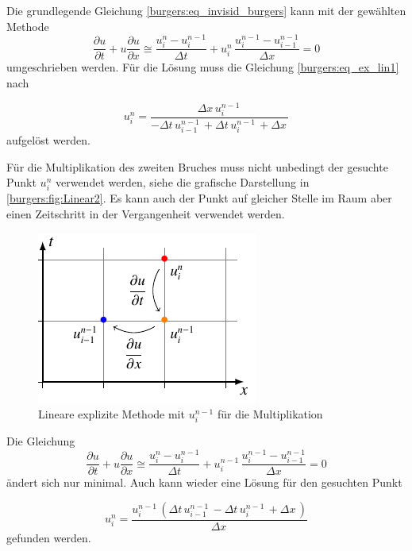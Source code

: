 	Die grundlegende Gleichung \eqref{burgers:eq_invisid_burgers} kann mit der gewählten Methode
	\begin{equation}
	  	\frac {\partial u}{\partial t}+u{\frac {\partial u}{\partial x}} \cong \frac{u_{i}^{n}-u_{i}^{n-1}}{\Delta t}+ u_{i}^{n}\, \frac{u_{i}^{n-1}-u_{i-1}^{n-1}}{\Delta x}=0
	  	  \label{burgers:eq_ex_lin1}
	  	\end{equation}
        umgeschrieben werden.
	  	Für die Lösung muss die Gleichung \eqref{burgers:eq_ex_lin1} nach

	  	\begin{equation}
	  u_{i}^{n} = \frac{\Delta{x}\, u^{n-1}_{i}\,}{- \Delta{t}\, u^{n-1}_{i-1}\, + \Delta{t}\, u^{n-1}_{i}\, + \Delta{x}\,}
		  \label{burgers:eq_ex_sol_lin1}
	\end{equation}
 	aufgelöst werden.

\medskip

	Für die Multiplikation des zweiten Bruches muss nicht unbedingt der gesuchte Punkt $u_{i}^{n}$ verwendet werden, siehe die grafische Darstellung in \autoref{burgers:fig:Linear2}.
	Es kann auch der Punkt auf gleicher Stelle im Raum aber einen Zeitschritt in der Vergangenheit verwendet werden.


     \begin{figure}
	\centering
	\includegraphics[height=.4\textwidth]{papers/burgers/BurgersEquation/tikz/linear2/linear2.pdf}
	\caption{Lineare explizite Methode mit  $u_{i}^{n-1}$ f\"ur die Multiplikation}
	\label{burgers:fig:Linear2}
	\end{figure}
	Die Gleichung
	\begin{equation}
			\frac {\partial u}{\partial t}+u{\frac {\partial u}{\partial x}} \cong \frac{u_{i}^{n}-u_{i}^{n-1}}{\Delta t}+ u_{i}^{n-1}\, \frac{u_{i}^{n-1}-u_{i-1}^{n-1}}{\Delta x}=0
		\label{burgers:eq_ex_lin2}
	\end{equation}
	ändert sich nur minimal.
	 Auch kann wieder eine Lösung für den gesuchten Punkt

	\begin{equation}
		u_{i}^{n} = \frac{u^{n-1}_{i}\, \left(\Delta{t}\, u^{n-1}_{i-1}\, - \Delta{t}\, u^{n-1}_{i}\, + \Delta{x}\,\right)}{\Delta{x}\,}
    	\label{burgers:eq_ex_sol_lin2}
	\end{equation}
gefunden werden.

